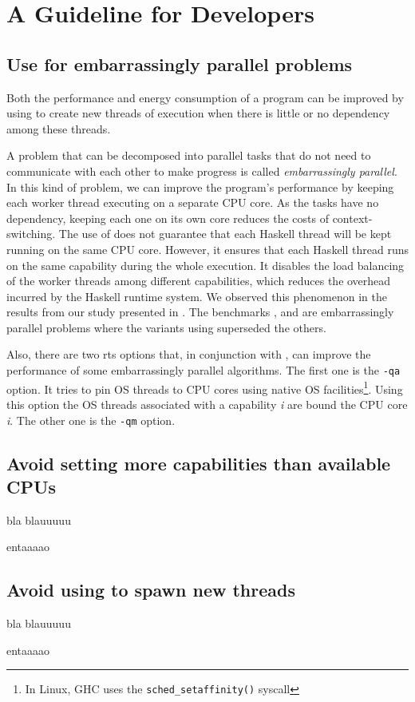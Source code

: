 \chapter{A Guideline for Developers}
\lipsum[1-2]


\section{Use \forkOn for embarrassingly parallel problems}
 Both the performance and energy consumption of a program can be improved by using \forkOn to create new threads of execution when there is little or no dependency among these threads.
\newline

 A problem that can be decomposed into parallel tasks that do not need to communicate with each other to make progress is called \emph{embarrassingly parallel}. In this kind of problem, we can improve the program's performance by keeping each worker thread executing on a separate CPU core. As the tasks have no dependency, keeping each one on its own core reduces the costs of context-switching. The use of \forkOn does not guarantee that each Haskell thread will be kept running on the same CPU core. However, it ensures that each Haskell thread runs on the same capability during the whole execution. It disables the load balancing of the worker threads among different capabilities, which reduces the overhead incurred by the Haskell runtime system. We observed this phenomenon in the results from our study presented in . The benchmarks \mandelbrot, \regex and \spectral are embarrassingly parallel problems where the variants using \forkOn superseded the others.

Also, there are two \ac{rts} options that, in conjunction with \forkOn, can improve the performance of some embarrassingly parallel algorithms. The first one is the \texttt{-qa} option. It tries to pin OS threads to CPU cores using native OS facilities\footnote{In Linux, GHC uses the \texttt{sched\_setaffinity()} syscall}. Using this option the OS threads associated with a capability \emph{i} are bound the CPU core \emph{i}. The other one is the \texttt{-qm} option.


\section{Avoid setting more capabilities than available CPUs}
 bla blauuuuu
\newline

 entaaaao


\section{Avoid using \forkOS to spawn new threads}
 bla blauuuuu
\newline

 entaaaao
